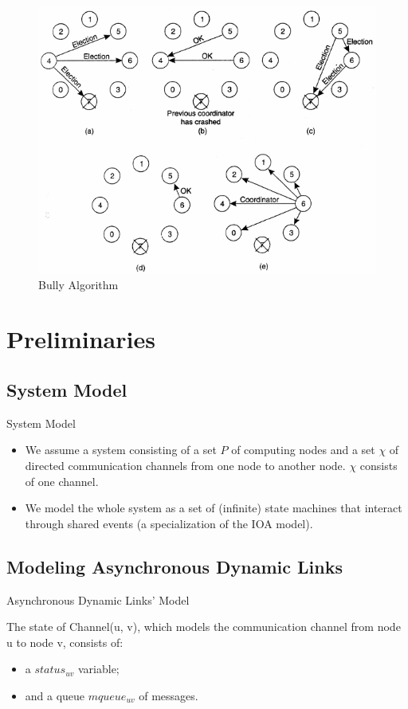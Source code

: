 \documentclass{beamer}
\begin{document}
\begin{frame}
	\begin{figure}
		\centering
		\includegraphics[width=0.7\linewidth]{bully_algorithm}
		\caption{Bully Algorithm}
		\label{fig:bullyalgorithm}
	\end{figure}
	
\end{frame}

\section{Preliminaries}
\subsection{System Model}

\begin{frame}{System Model}

\begin{itemize}
	\item We assume a system consisting of a set $P$ of computing nodes and a set $\chi$ of directed communication channels from one node to another node. $\chi$ consists of one channel.
	\item We model the whole system as a set of (infinite) state machines that interact through shared events (a specialization of the IOA model).

\end{itemize}

\end{frame}


\subsection{Modeling Asynchronous Dynamic Links}
\begin{frame}{Asynchronous Dynamic Links' Model}

	The state of Channel(u, v), which models the communication channel from node u to node v, consists of:
	\begin{itemize}
		\item a $status_{uv}$ variable;
		\item and a queue $mqueue_{uv}$ of messages.
	\end{itemize}
	 

\end{frame}
\end{document}
